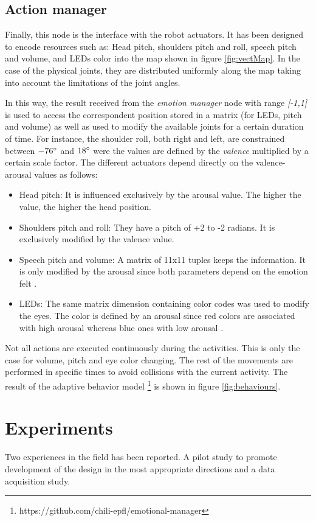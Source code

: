 \documentclass[a4paper, 10pt, conference]{ieeeconf}      %
\begin{document}
\subsection{Action manager}
Finally, this node is the interface with the robot actuators. It has been designed to encode resources such as: Head pitch, shoulders pitch and roll, speech pitch and volume, and LEDs color into the map shown in figure \ref{fig:vectMap}. In the case of the physical joints, they are distributed uniformly along the map taking into account the limitations of the joint angles. 

In this way, the result received from the \textit{emotion manager} node with range \textit{[-1,1]} is used to access the correspondent position stored in a matrix (for LEDs, pitch and volume) as well as used to modify the available joints for a certain duration of time. For instance, the shoulder roll, both right and left, are constrained between $ -76\degree $ and $ 18\degree $ were the values are defined by the \textit{valence} multiplied by a certain scale factor. The different actuators depend directly on the valence-arousal values as follows: 

\begin{itemize}
\item Head pitch: It is influenced exclusively by the arousal value. The higher the value, the higher the head position.
\item Shoulders pitch and roll: They have a pitch of +2 to -2 radians. It is exclusively modified by the valence value.
\item Speech pitch and volume: A matrix of 11x11 tuples keeps the information. It is only modified by the arousal since both parameters depend on the emotion felt \cite{banse1996acoustic}. 
\item LEDs: The same matrix dimension containing color codes was used to modify the eyes. The color is defined by an arousal since red colors are associated with high arousal whereas blue ones with low arousal \cite{elliot2014color}.
\end{itemize}

Not all actions are executed continuously during the activities. This is only the case for volume, pitch and eye color changing. The rest of the movements are performed in specific times to avoid collisions with the current activity. The result of the adaptive behavior model \footnote{https://github.com/chili-epfl/emotional-manager} is shown in figure \ref{fig:behaviours}. 

\section{Experiments}\label{sec:experiments}
Two experiences in the field has been reported. A pilot study to promote development of the design in the most appropriate directions and a data acquisition study.
\end{document}

